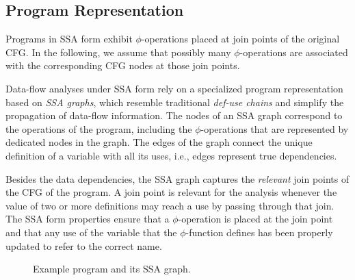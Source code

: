 \subsection{Program Representation}

Programs in SSA form exhibit $\phi$-operations placed at join
points of the original CFG. In the following, we assume that possibly many
$\phi$-operations are associated with the corresponding CFG nodes at those
join points.

Data-flow analyses under SSA form rely on a specialized program representation
based on \emph{SSA graphs}, which resemble traditional \emph{def-use chains} and
simplify the propagation of data-flow information. The nodes of an SSA graph
correspond to the operations of the program, including the 
$\phi$-operations that are represented by dedicated nodes in the graph. The
edges of the graph connect the unique definition of a variable with all its
uses, i.e., edges represent true dependencies.

Besides the data dependencies, the SSA graph captures the \emph{relevant} join 
points of the CFG of the program. A join point
is relevant for the analysis whenever the value of two or more definitions may
reach a use by passing through that join. The SSA form properties ensure that
a $\phi$-operation is placed at the join point and that any use of the variable
that the $\phi$-function defines has been properly updated to refer to the
correct name.

\begin{figure}[t]
  \hfill
  \hfill
  \caption{Example program and its SSA graph.}
  \label{novillo:fig:ssa_graph}
\end{figure}

